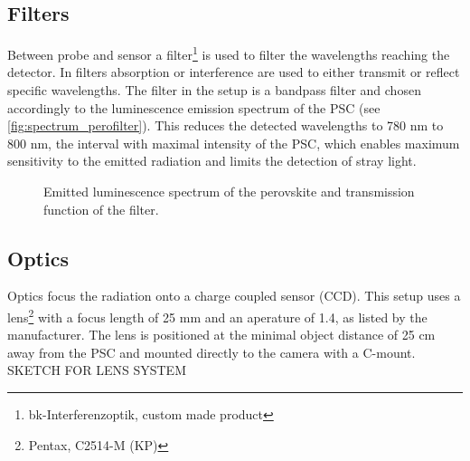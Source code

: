 \subsection{Filters}
Between probe and sensor a filter\footnote{bk-Interferenzoptik, custom made product} is used to filter the wavelengths reaching the detector. In filters absorption or interference are used to either transmit or reflect specific wavelengths. The filter in the setup is a bandpass filter and chosen accordingly to the luminescence emission spectrum of the PSC (see \autoref{fig:spectrum_perofilter}). This reduces the detected wavelengths to 780 nm to 800 nm, the interval with maximal intensity of the PSC, which enables maximum sensitivity to the emitted radiation and limits the detection of stray light. %

\begin{figure}[h]
	\centering
	
	\caption{Emitted luminescence spectrum of the perovskite and transmission function of the filter. }
	\label{fig:spectrum_perofilter}
\end{figure}
\subsection{Optics}
Optics focus the radiation onto a charge coupled sensor (CCD). This setup uses a lens\footnote{Pentax, C2514-M (KP)} with a focus length of 25 mm and an aperature of 1.4, as listed by the manufacturer. The lens is positioned at the minimal object distance of  25 cm away from the PSC and mounted directly to the camera with a C-mount.
\\
SKETCH FOR LENS SYSTEM
\\


